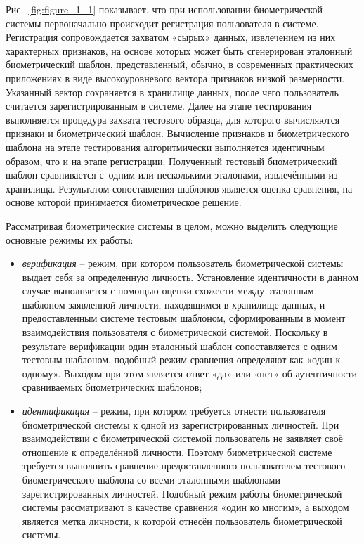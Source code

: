 \documentclass[12pt]{book}
\begin{document}
{Рис.~\ref{fig:figure_1_1} показывает, что при использовании биометрической системы первоначально происходит регистрация пользователя в системе. Регистрация сопровождается захватом «сырых» данных, извлечением из них характерных признаков, на основе которых может быть сгенерирован эталонный биометрический шаблон, представленный, обычно, в современных практических приложениях в виде высокоуровневого вектора признаков низкой размерности. Указанный вектор сохраняется в хранилище данных, после чего пользователь считается зарегистрированным в системе. Далее на этапе тестирования выполняется процедура захвата тестового образца, для которого вычисляются признаки и биометрический шаблон. Вычисление признаков и биометрического шаблона на этапе тестирования алгоритмически выполняется идентичным образом, что и на этапе регистрации. Полученный тестовый биометрический шаблон сравнивается с~одним или несколькими эталонами, извлечёнными из хранилища. Результатом сопоставления шаблонов является оценка сравнения, на основе которой принимается биометрическое решение.

Рассматривая биометрические системы в целом, можно выделить следующие основные режимы их работы:

\begin{itemize}[topsep=1pt] \itemsep0.1em
\item \textit{верификация} -- режим, при котором пользователь биометрической системы выдает себя за определенную личность. Установление идентичности в данном случае выполняется с помощью оценки схожести между эталонным шаблоном заявленной личности, находящимся в хранилище данных, и предоставленным системе тестовым шаблоном, сформированным в момент взаимодействия пользователя с биометрической системой. Поскольку в результате верификации один эталонный шаблон сопоставляется с одним тестовым шаблоном, подобный режим сравнения определяют как «один к одному». Выходом при этом является ответ «да» или «нет» об аутентичности сравниваемых биометрических шаблонов;

\item \textit{идентификация} -- режим, при котором требуется отнести пользователя биометрической системы к одной из зарегистрированных личностей. При взаимодействии с биометрической системой пользователь не заявляет своё отношение к определённой личности. Поэтому биометрической системе требуется выполнить сравнение предоставленного пользователем тестового биометрического шаблона со всеми эталонными шаблонами зарегистрированных личностей. Подобный режим работы биометрической системы рассматривают в качестве сравнения «один ко многим», а выходом является метка личности, к которой отнесён пользователь биометрической системы.
\end{itemize}

}
\end{document}
